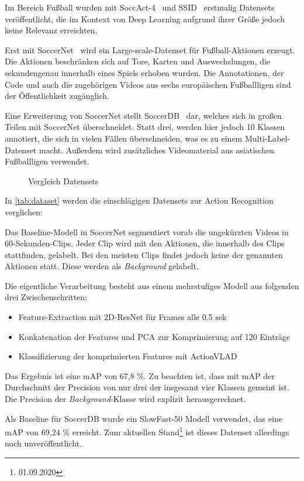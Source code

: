 Im Bereich Fußball wurden mit SoccAct-4~\cite{Ballan09} und SSID~\cite{Jiang16} erstmalig Datensets veröffentlicht, die im Kontext von Deep Learning aufgrund ihrer Größe jedoch keine Relevanz erreichten.

Erst mit SoccerNet~\cite{Giancola18} wird ein Large-scale-Datenset für Fußball-Aktionen erzeugt.
Die Aktionen beschränken sich auf Tore, Karten und Auswechslungen, die sekundengenau innerhalb eines Spiels erhoben wurden.
Die Annotationen, der Code und auch die zugehörigen Videos aus sechs europäischen Fußballligen sind der Öffentlichkeit zugänglich.

Eine Erweiterung von SoccerNet stellt SoccerDB~\cite{Jiang19} dar, welches sich in großen Teilen mit SoccerNet überschneidet.
Statt drei, werden hier jedoch 10 Klassen annotiert, die sich in vielen Fällen überschneiden, was es zu einem Multi-Label-Datenset macht.
Außerdem wird zusätzliches Videomaterial aus asiatischen Fußballligen verwendet.

\begin{figure}
    \centering
    \caption[Vergleich Datensets]{Vergleich Datensets}
    \label{tab:dataset}
\end{figure}

In \autoref{tab:dataset} werden die einschlägigen Datensets zur Action Recognition verglichen:

Das Baseline-Modell in SoccerNet segmentiert vorab die ungekürzten Videos in 60-Sekunden-Clips.
Jeder Clip wird mit den Aktionen, die innerhalb des Clips stattfinden, gelabelt.
Bei den meisten Clips findet jedoch keine der genannten Aktionen statt.
Diese werden als \emph{Background} gelabelt.

Die eigentliche Verarbeitung besteht aus einem mehrstufiges Modell aus folgenden drei Zwischenschritten:

\begin{itemize}
    \item Feature-Extraction mit 2D-ResNet für Frames alle 0.5 sek
    \item Konkatenation der Features und PCA zur Komprimierung auf 120 Einträge
    \item Klassifizierung der komprimierten Features mit ActionVLAD
\end{itemize}

Das Ergebnis ist eine mAP von 67,8 \%.
Zu beachten ist, dass mit mAP der Durchschnitt der Precision von nur drei der insgesamt vier Klassen gemeint ist.
Die Precision der \emph{Background}-Klasse wird explizit herausgerechnet.

Als Baseline für SoccerDB wurde ein SlowFast-50 Modell verwendet, das eine mAP von 69,24 \% erreicht.
Zum aktuellen Stand\footnote{01.09.2020} ist dieses Datenset allerdings noch unveröffentlicht.
